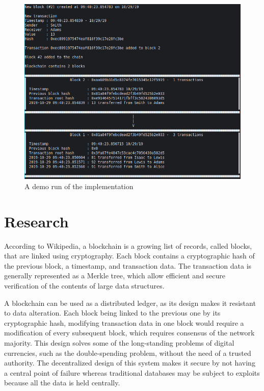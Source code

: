 \documentclass{article}
\begin{document}
\begin{figure}[h!]
    \begin{center}
        \includegraphics[width=0.7\linewidth]{demo.png}
        \caption{A demo run of the implementation}
        \label{fig:demo}
    \end{center}
\end{figure}


\section{Research}\label{Research}

According to Wikipedia\cite{wiki:blockchain}, a blockchain is a growing list of records, called blocks, that are linked using cryptography. Each block contains a cryptographic hash of the previous block, a timestamp, and transaction data. The transaction data is generally represented as a Merkle tree, which allow efficient and secure verification of the contents of large data structures.

\bigskip

A blockchain can be used as a distributed ledger, as its design makes it resistant to data alteration. Each block being linked to the previous one by its cryptographic hash, modifying transaction data in one block would require a modification of every subsequent block, which requires consensus of the network majority. This design solves some of the long-standing problems of digital currencies, such as the double-spending problem, without the need of a trusted authority. The decentralized design of this system makes it secure by not having a central point of failure whereas traditional databases may be subject to exploits because all the data is held centrally.

\bigskip
\end{document}
